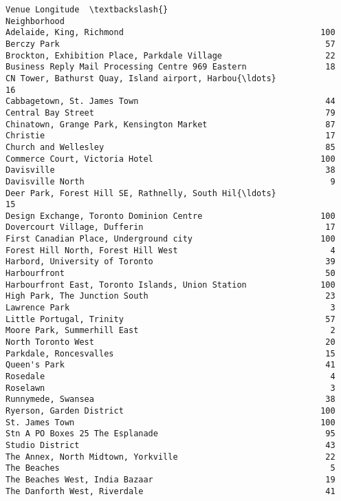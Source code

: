 \documentclass[11pt]{article}
\begin{document}
\begin{tcolorbox}[breakable, size=fbox, boxrule=.5pt, pad at break*=1mm, opacityfill=0]
\begin{Verbatim}[commandchars=\\\{\}]
                                                    Venue Longitude  \textbackslash{}
Neighborhood
Adelaide, King, Richmond                                        100
Berczy Park                                                      57
Brockton, Exhibition Place, Parkdale Village                     22
Business Reply Mail Processing Centre 969 Eastern                18
CN Tower, Bathurst Quay, Island airport, Harbou{\ldots}               16
Cabbagetown, St. James Town                                      44
Central Bay Street                                               79
Chinatown, Grange Park, Kensington Market                        87
Christie                                                         17
Church and Wellesley                                             85
Commerce Court, Victoria Hotel                                  100
Davisville                                                       38
Davisville North                                                  9
Deer Park, Forest Hill SE, Rathnelly, South Hil{\ldots}               15
Design Exchange, Toronto Dominion Centre                        100
Dovercourt Village, Dufferin                                     17
First Canadian Place, Underground city                          100
Forest Hill North, Forest Hill West                               4
Harbord, University of Toronto                                   39
Harbourfront                                                     50
Harbourfront East, Toronto Islands, Union Station               100
High Park, The Junction South                                    23
Lawrence Park                                                     3
Little Portugal, Trinity                                         57
Moore Park, Summerhill East                                       2
North Toronto West                                               20
Parkdale, Roncesvalles                                           15
Queen's Park                                                     41
Rosedale                                                          4
Roselawn                                                          3
Runnymede, Swansea                                               38
Ryerson, Garden District                                        100
St. James Town                                                  100
Stn A PO Boxes 25 The Esplanade                                  95
Studio District                                                  43
The Annex, North Midtown, Yorkville                              22
The Beaches                                                       5
The Beaches West, India Bazaar                                   19
The Danforth West, Riverdale                                     41


\end{Verbatim}
\end{tcolorbox}
\end{document}
